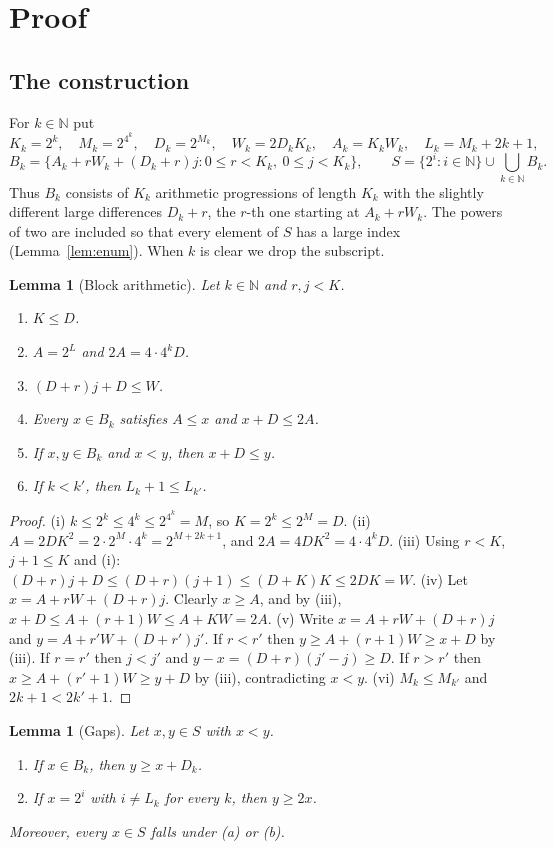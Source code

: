 \documentclass[11pt]{amsart}
\theoremstyle{plain}
\newtheorem{lemma}[theorem]{Lemma}
\theoremstyle{definition}
\newcommand{\N}{\mathbb{N}}
\begin{document}
\section{Proof}\label{sec:proof}

\subsection{The construction}
For $k\in\N$ put
\[
  K_k=2^k,\quad M_k=2^{4^k},\quad D_k=2^{M_k},\quad W_k=2D_kK_k,\quad A_k=K_kW_k,\quad L_k=M_k+2k+1,
\]
\[
  B_k=\bigl\{A_k+rW_k+(D_k+r)j : 0\le r<K_k,\ 0\le j<K_k\bigr\},\qquad
  S=\{2^i:i\in\N\}\cup\bigcup_{k\in\N}B_k .
\]
Thus $B_k$ consists of $K_k$ arithmetic progressions of length $K_k$ with the slightly different large differences $D_k+r$, the $r$-th one starting at $A_k+rW_k$.
The powers of two are included so that every element of $S$ has a large index (Lemma~\ref{lem:enum}).
When $k$ is clear we drop the subscript.

\begin{lemma}[Block arithmetic]\label{lem:block}
Let $k\in\N$ and $r,j<K$.
\begin{enumerate}
\item[(i)] $K\le D$.
\item[(ii)] $A=2^{L}$ and $2A=4\cdot4^kD$.
\item[(iii)] $(D+r)j+D\le W$.
\item[(iv)] Every $x\in B_k$ satisfies $A\le x$ and $x+D\le 2A$.
\item[(v)] If $x,y\in B_k$ and $x<y$, then $x+D\le y$.
\item[(vi)] If $k<k'$, then $L_k+1\le L_{k'}$.
\end{enumerate}
\end{lemma}

\begin{proof}
(i) $k\le 2^k\le 4^k\le 2^{4^k}=M$, so $K=2^k\le2^{M}=D$.
(ii) $A=2DK^2=2\cdot2^{M}\cdot4^k=2^{M+2k+1}$, and $2A=4DK^2=4\cdot4^kD$.
(iii) Using $r<K$, $j+1\le K$ and (i): $(D+r)j+D\le(D+r)(j+1)\le(D+K)K\le2DK=W$.
(iv) Let $x=A+rW+(D+r)j$. Clearly $x\ge A$, and by (iii), $x+D\le A+(r+1)W\le A+KW=2A$.
(v) Write $x=A+rW+(D+r)j$ and $y=A+r'W+(D+r')j'$. If $r<r'$ then $y\ge A+(r+1)W\ge x+D$ by (iii). If $r=r'$ then $j<j'$ and $y-x=(D+r)(j'-j)\ge D$. If $r>r'$ then $x\ge A+(r'+1)W\ge y+D$ by (iii), contradicting $x<y$.
(vi) $M_k\le M_{k'}$ and $2k+1<2k'+1$.
\end{proof}

\begin{lemma}[Gaps]\label{lem:gaps}
Let $x,y\in S$ with $x<y$.
\begin{enumerate}
\item[(a)] If $x\in B_k$, then $y\ge x+D_k$.
\item[(b)] If $x=2^i$ with $i\ne L_k$ for every $k$, then $y\ge2x$.
\end{enumerate}
Moreover, every $x\in S$ falls under (a) or (b).
\end{lemma}
\end{document}
